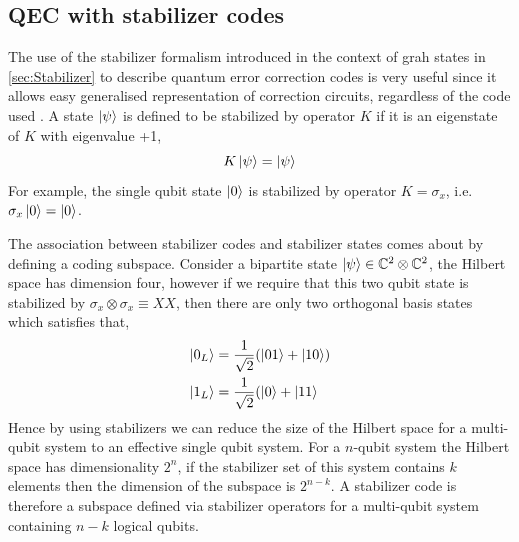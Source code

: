 \documentclass[10pt,a4paper]{book}
\numberwithin{equation}{chapter}
\numberwithin{figure}{chapter}
\numberwithin{table}{chapter}
\begin{document}
\subsection{QEC with stabilizer codes}
The use of the stabilizer formalism introduced in the context of grah states in                                                                                 
 \autoref{sec:Stabilizer} to describe quantum error correction codes is very useful since it allows easy generalised representation of correction circuits, regardless of the code used \cite{Gottesman}.
A state $\ket{\psi}$ is defined to be stabilized by operator $K$ if it is an eigenstate of $K$ with eigenvalue +1,
\begin{equation}
K\ket{\psi}=\ket{\psi}
\end{equation}
For example, the single qubit state $\ket{0}$ is stabilized by operator $K=\sigma_x$, i.e. $\sigma_x \ket{0}=\ket{0}$.

The association between stabilizer codes and stabilizer states comes about by defining a coding subspace. Consider a bipartite state $\ket{\psi}\in \mathbb{C}^2 \otimes \mathbb{C}^2$, the Hilbert space has dimension four, however if we require that this two qubit state is stabilized by $\sigma_x \otimes \sigma_x \equiv XX$, then there are only two orthogonal basis states which satisfies that,
\begin{align}
\ket{0_L}&=\frac{1}{\sqrt{2}}(\ket{01}+\ket{10})\\
\ket{1_L}&=\frac{1}{\sqrt{2}}(\ket{0}+\ket{11}
\end{align}
Hence by using stabilizers we can reduce the size of the Hilbert space for a multi-qubit system to an effective single qubit system. For a $n$-qubit system the Hilbert space has dimensionality $2^n$, if the stabilizer set of this system contains $k$ elements then the dimension of the subspace is $2^{n-k}$. A stabilizer code is therefore a subspace defined via stabilizer operators for a multi-qubit system containing $n-k$ logical qubits.
\end{document}
